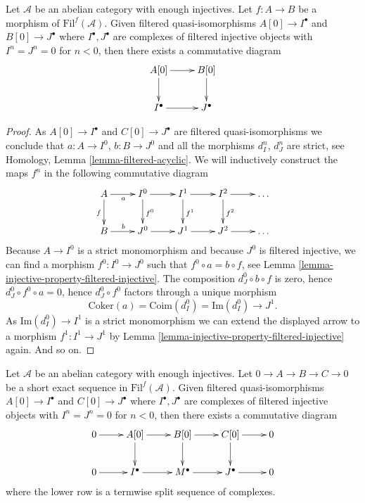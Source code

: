 \begin{lemma}
\label{lemma-filtered-injective-right-resolution-map}
Let $\mathcal{A}$ be an abelian category with enough injectives.
Let $f : A \to B$ be a morphism of $\text{Fil}^f(\mathcal{A})$.
Given filtered quasi-isomorphisms $A[0] \to I^\bullet$ and
$B[0] \to J^\bullet$ where $I^\bullet, J^\bullet$ are complexes of
filtered injective objects with $I^n = J^n = 0$ for $n < 0$, then
there exists a commutative diagram
$$
\xymatrix{
A[0] \ar[r] \ar[d] &
B[0] \ar[d] \\
I^\bullet \ar[r] &
J^\bullet
}
$$
\end{lemma}

\begin{proof}
As $A[0] \to I^\bullet$ and $C[0] \to J^\bullet$ are filtered
quasi-isomorphisms we conclude that $a : A \to I^0$, $b : B \to J^0$
and all the morphisms $d_I^n$, $d_J^n$ are strict, see
Homology, Lemma \ref{lemma-filtered-acyclic}.
We will inductively construct the maps $f^n$ in the following
commutative diagram
$$
\xymatrix{
A \ar[r]_a \ar[d]_f &
I^0 \ar[r] \ar[d]^{f^0} &
I^1 \ar[r] \ar[d]^{f^1} &
I^2 \ar[r] \ar[d]^{f^2} &
\ldots \\
B \ar[r]^b &
J^0 \ar[r] &
J^1 \ar[r] &
J^2 \ar[r] &
\ldots
}
$$
Because $A \to I^0$ is a strict monomorphism and because 
$J^0$ is filtered injective, we can find a morphism $f^0 : I^0 \to J^0$
such that $f^0 \circ a = b \circ f$, see
Lemma \ref{lemma-injective-property-filtered-injective}.
The composition $d_J^0 \circ b \circ f$ is zero, hence
$d_J^0 \circ f^0 \circ a = 0$, hence $d_J^0 \circ f^0$ factors
through a unique morphism
$$
\text{Coker}(a) = \text{Coim}(d_I^0) = \text{Im}(d_I^0) \longrightarrow J^1.
$$
As $\text{Im}(d_I^0) \to I^1$ is a strict monomorphism we can extend the
displayed arrow to a morphism $f^1 : I^1 \to J^1$ by
Lemma \ref{lemma-injective-property-filtered-injective}
again. And so on.
\end{proof}

\begin{lemma}
\label{lemma-filtered-injective-right-resolution-ses}
Let $\mathcal{A}$ be an abelian category with enough injectives.
Let $0 \to A \to B \to C \to 0$ be a short exact sequence in
$\text{Fil}^f(\mathcal{A})$.
Given filtered quasi-isomorphisms $A[0] \to I^\bullet$ and
$C[0] \to J^\bullet$ where $I^\bullet, J^\bullet$ are complexes of
filtered injective objects with $I^n = J^n = 0$ for $n < 0$, then
there exists a commutative diagram
$$
\xymatrix{
0 \ar[r] &
A[0] \ar[r] \ar[d] &
B[0] \ar[r] \ar[d] &
C[0] \ar[r] \ar[d] &
0 \\
0 \ar[r] &
I^\bullet \ar[r] &
M^\bullet \ar[r] &
J^\bullet \ar[r] &
0
}
$$
where the lower row is a termwise split sequence of complexes.
\end{lemma}

